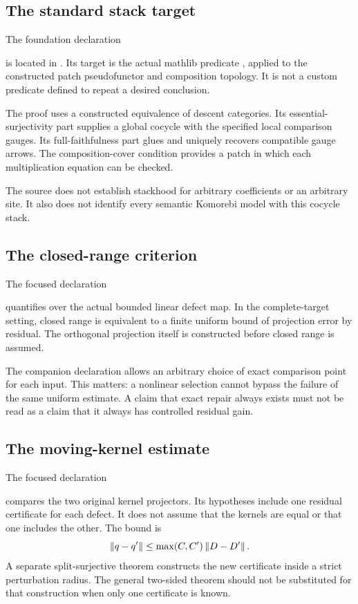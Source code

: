 \documentclass[11pt]{article}
\begin{document}
\subsection{The standard stack target}
The foundation declaration
\begin{center}\small{}\end{center}
is located in . Its target is the actual mathlib predicate , applied to the constructed patch pseudofunctor and composition topology. It is not a custom predicate defined to repeat a desired conclusion.

The proof uses a constructed equivalence of descent categories. Its essential-surjectivity part supplies a global cocycle with the specified local comparison gauges. Its full-faithfulness part glues and uniquely recovers compatible gauge arrows. The composition-cover condition provides a patch in which each multiplication equation can be checked.

The source does not establish stackhood for arbitrary coefficients or an arbitrary site. It also does not identify every semantic Komorebi model with this cocycle stack.

\subsection{The closed-range criterion}
The focused declaration
\begin{center}\small{}\end{center}
quantifies over the actual bounded linear defect map. In the complete-target setting, closed range is equivalent to a finite uniform bound of projection error by residual. The orthogonal projection itself is constructed before closed range is assumed.

The companion declaration  allows an arbitrary choice of exact comparison point for each input. This matters: a nonlinear selection cannot bypass the failure of the same uniform estimate. A claim that exact repair always exists must not be read as a claim that it always has controlled residual gain.

\subsection{The moving-kernel estimate}
The focused declaration
\begin{center}\small{}\end{center}
compares the two original kernel projectors. Its hypotheses include one residual certificate for each defect. It does not assume that the kernels are equal or that one includes the other. The bound is
\[
 \left\lVert q-q'\right\rVert\le\max(C,C')\left\lVert D-D'\right\rVert.
\]
A separate split-surjective theorem constructs the new certificate inside a strict perturbation radius. The general two-sided theorem should not be substituted for that construction when only one certificate is known.
\end{document}
